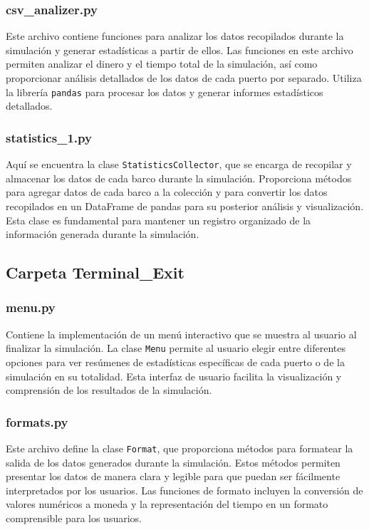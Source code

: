 \documentclass[12pt]{article}
\begin{document}
        \subsubsection{csv\_analizer.py}
        Este archivo contiene funciones para analizar los datos recopilados durante la simulación y generar estadísticas a partir de ellos. Las funciones en este archivo permiten analizar el dinero y el tiempo total de la simulación, así como proporcionar análisis detallados de los datos de cada puerto por separado. Utiliza la librería \texttt{pandas} para procesar los datos y generar informes estadísticos detallados.\\
        
        \subsubsection{statistics\_1.py}
        Aquí se encuentra la clase \texttt{StatisticsCollector}, que se encarga de recopilar y almacenar los datos de cada barco durante la simulación. Proporciona métodos para agregar datos de cada barco a la colección y para convertir los datos recopilados en un DataFrame de pandas para su posterior análisis y visualización. Esta clase es fundamental para mantener un registro organizado de la información generada durante la simulación.\\
        
    \subsection{Carpeta Terminal\_Exit}
        \subsubsection{menu.py}
        Contiene la implementación de un menú interactivo que se muestra al usuario al finalizar la simulación. La clase \texttt{Menu} permite al usuario elegir entre diferentes opciones para ver resúmenes de estadísticas específicas de cada puerto o de la simulación en su totalidad. Esta interfaz de usuario facilita la visualización y comprensión de los resultados de la simulación.\\
        
        \subsubsection{formats.py}
        Este archivo define la clase \texttt{Format}, que proporciona métodos para formatear la salida de los datos generados durante la simulación. Estos métodos permiten presentar los datos de manera clara y legible para que puedan ser fácilmente interpretados por los usuarios. Las funciones de formato incluyen la conversión de valores numéricos a moneda y la representación del tiempo en un formato comprensible para los usuarios.\\
\end{document}

